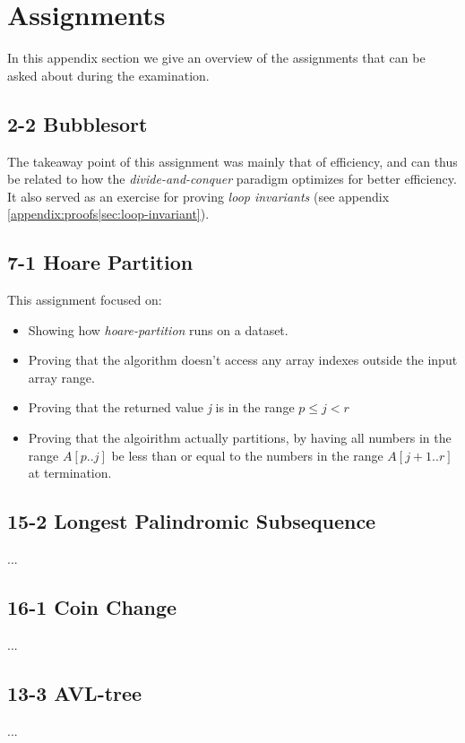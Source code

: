
\thispagestyle{fancyplain}

\chapter{Assignments}
\label{appendix:assignments}
In this appendix section we give an overview of the assignments that can be
asked about during the examination.

\section{2-2 Bubblesort}
\label{appendix:assignments|ass:bubblesort}
The takeaway point of this assignment was mainly that of efficiency, and can
thus be related to how the \textit{divide-and-conquer} paradigm optimizes for
better efficiency. It also served as an exercise for proving \textit{loop
invariants} (see appendix \ref{appendix:proofs|sec:loop-invariant}).

\section{7-1 Hoare Partition}
\label{appendix:assignments|ass:hoare-partition}
This assignment focused on:
\begin{itemize}
\item Showing how \textit{hoare-partition} runs on a dataset.
\item Proving that the algorithm doesn't access any array indexes outside the 
input array range.
\item Proving that the returned value \textit{j} is in the range $p\leq j < r$
\item Proving that the algoirithm actually partitions, by having all numbers in 
the range $A[p..j]$ be less than or equal to the numbers in the range $A[j+1..r]$ 
at termination.
\end{itemize}

\section{15-2 Longest Palindromic Subsequence}
\label{appendix:assignments|ass:longest-palindromic-subsequence}
...

\section{16-1 Coin Change}
\label{appendix:assignments|ass:coin-change}
...

\section{13-3 AVL-tree}
\label{appendix:assignments|ass:avl-tree}
...
